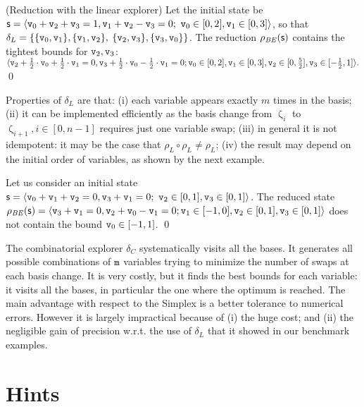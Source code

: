 \documentclass{llncs}
\begin{document}
\begin{example}(Reduction with the linear explorer)
Let the initial state be $\mathsf{\mathsf{s}}= \langle \mathtt{v}_0 + \mathtt{v}_2 + \mathtt{v}_3 = 1, \mathtt{v}_1 + \mathtt{v}_2 - \mathtt{v}_3 = 0;\ \mathtt{v}_0 \in [0,2], \mathtt{v}_1 \in [0,3]  \rangle$, so that $\delta_L = \{ \{ \mathtt{v}_0, \mathtt{v}_1\},  \{ \mathtt{v}_1, \mathtt{v}_2\},$ $ \{ \mathtt{v}_2, \mathtt{v}_3 \}, \{\mathtt{v}_3, \mathtt{v}_0 \}\}$.
The reduction $\rho_\mathit{BE}(\mathsf{\mathsf{s}})$ contains the tightest bounds for $\mathtt{v}_2, \mathtt{v}_3$:
\(
\langle \mathtt{v}_2 + \frac{1}{2} \cdot \mathtt{v}_0 + \frac{1}{2} \cdot \mathtt{v}_1 = 0, \mathtt{v}_3 + \frac{1}{2} \cdot \mathtt{v}_0 - \frac{1}{2} \cdot \mathtt{v}_1 = 0;
\mathtt{v}_0\in [0,2], \mathtt{v}_1 \in [0, 3], \mathtt{v}_2 \in[0, \frac{5}{2}], \mathtt{v}_3 \in [-\frac{1}{2}, 1]  \rangle. 
\)
\qed
\end{example}
Properties of $\delta_L$ are that: (i) each variable appears exactly $m$ times in the basis; (ii) it can be implemented efficiently as the basis change from $\upzeta_i$ to $\upzeta_{i+1}, i \in [0, n-1]$ requires just one variable swap; (iii) in general it is not idempotent: it may be the case that $\rho_L \circ \rho_L \neq \rho_L$; (iv) the result may depend on the initial order of variables, as shown by the next example.

\begin{example}
Let us consider an initial state $\mathsf{\mathsf{s}} = \langle  \mathtt{v}_0 + \mathtt{v}_1 + \mathtt{v}_2 = 0, \mathtt{v}_3 + \mathtt{v}_1 = 0;\ \mathtt{v}_2 \in [0,1], \mathtt{v}_3 \in [0,1] \rangle$.
The reduced state $\rho_\mathit{BE}(\mathsf{\mathsf{s}}) = \langle \mathtt{v}_3 + \mathtt{v}_1
  = 0, \mathtt{v}_2 + \mathtt{v}_0 - \mathtt{v}_1 = 0 ; \mathtt{v}_1 \in [-1,0], \mathtt{v}_2 \in [0,1], \mathtt{v}_3 \in [0,1]  \rangle$ does not contain the bound $\mathtt{v}_0 \in [-1, 1]$. \qed
\end{example}

 The combinatorial explorer $\delta_C$ systematically visits all the bases.
It generates all possible combinations of $\mathtt{m}$ variables trying to minimize the number of swaps at each basis change. 
It is very costly, but it finds the best bounds for each variable: it visits all the bases, in particular the one where the optimum is reached.
The main advantage with respect to the Simplex is a better tolerance to numerical errors.
However it is largely impractical because of (i) the huge cost; and (ii) the negligible gain of precision w.r.t. the use of $\delta_L$ that it showed in our benchmark examples.


\section{Hints}
\end{document}
